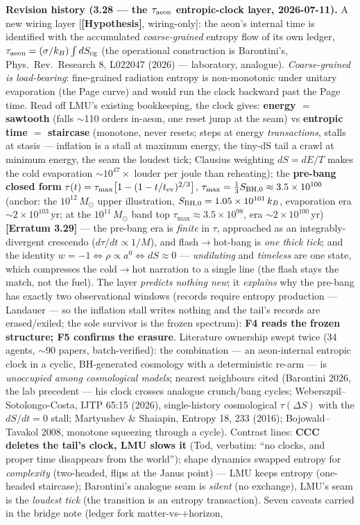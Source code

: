 \documentclass[11pt]{article}
\newcommand{\hyp}{\textcolor{orange!80!black}{\textbf{[Hypothesis]}}}
\newcommand{\msun}{M_\odot}
\begin{document}
{\smallskip\noindent\textbf{Revision history (3.28 --- the $\tau_{\rm aeon}$ entropic-clock layer, 2026-07-11).} A new wiring layer [\hyp, wiring-only]: the aeon's internal time is identified with the accumulated \emph{coarse-grained} entropy flow of its own ledger, $\tau_{\rm aeon}=(\sigma/k_B)\int dS_{\rm cg}$ (the operational construction is Barontini's, Phys.\ Rev.\ Research 8, L022047 (2026) --- laboratory, analogue). \emph{Coarse-grained is load-bearing}: fine-grained radiation entropy is non-monotonic under unitary evaporation (the Page curve) and would run the clock backward past the Page time. Read off LMU's existing bookkeeping, the clock gives: \textbf{energy $=$ sawtooth} (falls $\sim$110 orders in-aeon, one reset jump at the seam) vs \textbf{entropic time $=$ staircase} (monotone, never resets; steps at energy \emph{transactions}, stalls at stasis --- inflation is a stall at maximum energy, the tiny-dS tail a crawl at minimum energy, the seam the loudest tick; Clausius weighting $dS=dE/T$ makes the cold evaporation $\sim$$10^{47}\times$ louder per joule than reheating); the \textbf{pre-bang closed form} $\tau(t)=\tau_{\max}\big[1-(1-t/t_{\rm ev})^{2/3}\big]$, $\tau_{\max}=\tfrac13 S_{\rm BH,0}\approx3.5\times10^{100}$ (anchor: the $10^{12}\,\msun$ upper illustration, $S_{\rm BH,0}=1.05\times10^{101}\,k_B$, evaporation era $\sim2\times10^{103}$\,yr; at the $10^{11}\,\msun$ band top $\tau_{\max}\approx3.5\times10^{98}$, era $\sim2\times10^{100}$\,yr) \textbf{[Erratum 3.29]} --- the pre-bang era is \emph{finite} in $\tau$, approached as an integrably-divergent crescendo ($d\tau/dt\propto1/M$), and flash$\to$hot-bang is \emph{one thick tick}; and the identity $w=-1\iff\rho\propto a^0\iff dS\approx0$ --- \emph{undiluting} and \emph{timeless} are one state, which compresses the cold$\to$hot narration to a single line (the flash stays the match, not the fuel). The layer \emph{predicts nothing new}; it \emph{explains} why the pre-bang has exactly two observational windows (records require entropy production --- Landauer --- so the inflation stall writes nothing and the tail's records are erased/exiled; the sole survivor is the frozen spectrum): \textbf{F4 reads the frozen structure; F5 confirms the erasure}. Literature ownership swept twice (34 agents, $\sim$90 papers, batch-verified): the combination --- an aeon-internal entropic clock in a cyclic, BH-generated cosmology with a deterministic re-arm --- is \emph{unoccupied among cosmological models}; nearest neighbours cited (Barontini 2026, the lab precedent --- his clock crosses analogue crunch/bang cycles; Weberszpil--Sotolongo-Costa, IJTP 65:15 (2026), single-history cosmological $\tau(\Delta S)$ with the $dS/dt=0$ stall; Martyushev \& Shaiapin, Entropy 18, 233 (2016); Bojowald--Tavakol 2008, monotone squeezing through a cycle). Contrast lines: \textbf{CCC deletes the tail's clock, LMU slows it} (Tod, verbatim: ``no clocks, and proper time disappears from the world''); shape dynamics swapped entropy for \emph{complexity} (two-headed, flips at the Janus point) --- LMU keeps entropy (one-headed staircase); Barontini's analogue seam is \emph{silent} (no exchange), LMU's seam is the \emph{loudest tick} (the transition is an entropy transaction). Seven caveats carried in the bridge note (ledger fork matter-vs-$+$horizon, }
\end{document}
